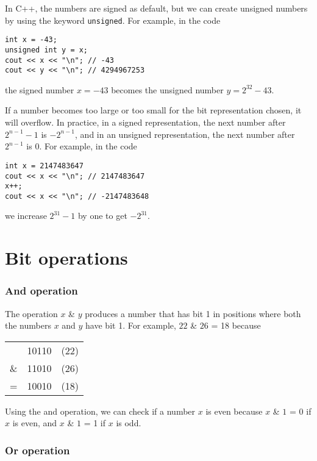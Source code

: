 In C++, the numbers are signed as default,
but we can create unsigned numbers by
using the keyword \texttt{unsigned}.
For example, in the code
\begin{lstlisting}
int x = -43;
unsigned int y = x;
cout << x << "\n"; // -43
cout << y << "\n"; // 4294967253
\end{lstlisting}
the signed number
$x=-43$ becomes the unsigned number $y=2^{32}-43$.

If a number becomes too large or too small for the
bit representation chosen, it will overflow.
In practice, in a signed representation,
the next number after $2^{n-1}-1$ is $-2^{n-1}$,
and in an unsigned representation,
the next number after $2^{n-1}$ is $0$.
For example, in the code
\begin{lstlisting}
int x = 2147483647
cout << x << "\n"; // 2147483647
x++;
cout << x << "\n"; // -2147483648
\end{lstlisting}
we increase $2^{31}-1$ by one to get $-2^{31}$.

\section{Bit operations}

\newcommand\XOR{\mathbin{\char`\^}}

\subsubsection{And operation}


The  operation $x$ \& $y$ produces a number
that has bit 1 in positions where both the numbers
$x$ and $y$ have bit 1.
For example, $22$ \& $26$ = 18 because

\begin{center}
\begin{tabular}{rrr}
& 10110 & (22)\\
\& & 11010 & (26) \\
\hline
 = & 10010 & (18) \\
\end{tabular}
\end{center}

Using the and operation, we can check if a number
$x$ is even because
$x$ \& $1$ = 0 if $x$ is even, and
$x$ \& $1$ = 1 if $x$ is odd.

\subsubsection{Or operation}

